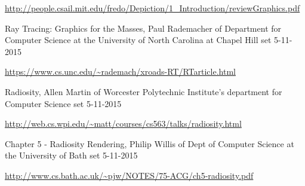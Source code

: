 \begin{thebibliography}{99}
  \url{http://people.csail.mit.edu/fredo/Depiction/1_Introduction/reviewGraphics.pdf}

  Ray Tracing: Graphics for the Masses, 
  Paul Rademacher of Department for Computer Science at the University of North Carolina at Chapel Hill
  set 5-11-2015

  \url{https://www.cs.unc.edu/~rademach/xroads-RT/RTarticle.html}

  Radiosity,
  Allen Martin of Worcester Polytechnic Institute's department for Computer Science
  set 5-11-2015

  \url{http://web.cs.wpi.edu/~matt/courses/cs563/talks/radiosity.html}

  Chapter 5 - Radiosity Rendering,
  Philip Willis of Dept of Computer Science at the University of Bath
  set 5-11-2015

  \url{http://www.cs.bath.ac.uk/~pjw/NOTES/75-ACG/ch5-radiosity.pdf}

\end{thebibliography}
\clearpage